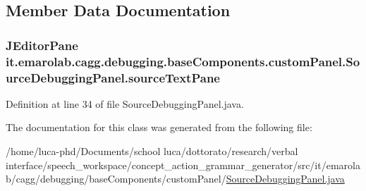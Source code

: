 \subsection{Member Data Documentation}
\hypertarget{classit_1_1emarolab_1_1cagg_1_1debugging_1_1baseComponents_1_1customPanel_1_1SourceDebuggingPanel_abb765e05fee2da3794c30a407577329b}{
\subsubsection[{source\-Text\-Pane}]{\setlength{\rightskip}{0pt plus 5cm}J\-Editor\-Pane it.\-emarolab.\-cagg.\-debugging.\-base\-Components.\-custom\-Panel.\-Source\-Debugging\-Panel.\-source\-Text\-Pane\hspace{0.3cm}{\ttfamily [private]}}}\label{classit_1_1emarolab_1_1cagg_1_1debugging_1_1baseComponents_1_1customPanel_1_1SourceDebuggingPanel_abb765e05fee2da3794c30a407577329b}


Definition at line 34 of file Source\-Debugging\-Panel.\-java.



The documentation for this class was generated from the following file\-:\begin{DoxyCompactItemize}
\item 
/home/luca-\/phd/\-Documents/school luca/dottorato/research/verbal interface/speech\-\_\-workspace/concept\-\_\-action\-\_\-grammar\-\_\-generator/src/it/emarolab/cagg/debugging/base\-Components/custom\-Panel/\hyperlink{SourceDebuggingPanel_8java}{Source\-Debugging\-Panel.\-java}\end{DoxyCompactItemize}
